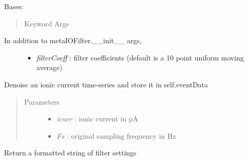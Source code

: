 \documentclass[letterpaper,10pt,english]{sphinxmanual}
\begin{document}
\begin{fulllineitems}
\label{api-doc/mosaic.filter:mosaic.convolutionFilter.convolutionFilter}
Bases: {\hyperref[api\string-doc/mosaic.meta:mosaic.metaIOFilter.metaIOFilter]{\emph{}}}
\begin{quote}\begin{description}
\item[{Keyword Args}] \leavevmode
\end{description}\end{quote}
\begin{description}
\item[{In addition to metaIOFilter.\_\_init\_\_ args,}] \leavevmode\begin{itemize}
\item {} 
\emph{filterCoeff} :               filter coefficients (default is a 10 point uniform moving average)

\end{itemize}

\end{description}

\begin{fulllineitems}
\label{api-doc/mosaic.filter:mosaic.convolutionFilter.convolutionFilter.filterData}
Denoise an ionic current time-series and store it in self.eventData
\begin{quote}\begin{description}
\item[{Parameters}] \leavevmode\begin{itemize}
\item {} 
\emph{icurr} :     ionic current in pA

\item {} 
\emph{Fs} :        original sampling frequency in Hz

\end{itemize}

\end{description}\end{quote}

\end{fulllineitems}


\begin{fulllineitems}
\label{api-doc/mosaic.filter:mosaic.convolutionFilter.convolutionFilter.formatsettings}
Return a formatted string of filter settings

\end{fulllineitems}


\end{fulllineitems}
\end{document}
